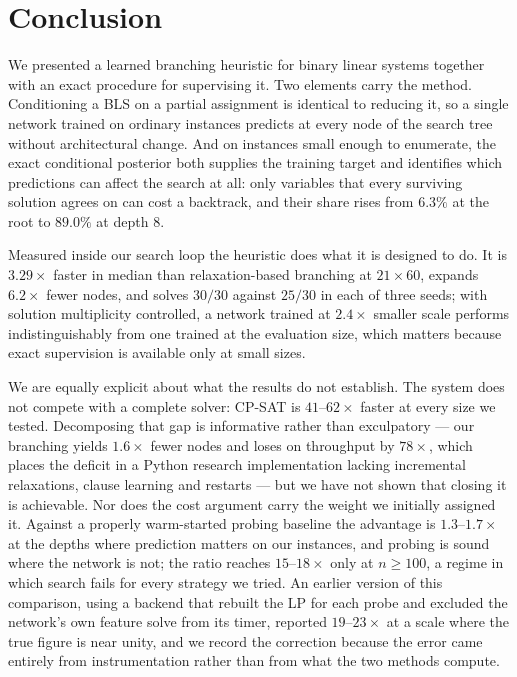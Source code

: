 \documentclass[11pt]{article}
\begin{document}
\section{Conclusion}
\label{sec:conclusion}

We presented a learned branching heuristic for binary linear systems together with an exact procedure for supervising it. Two elements carry the method. Conditioning a BLS on a partial assignment is identical to reducing it, so a single network trained on ordinary instances predicts at every node of the search tree without architectural change. And on instances small enough to enumerate, the exact conditional posterior both supplies the training target and identifies which predictions can affect the search at all: only variables that every surviving solution agrees on can cost a backtrack, and their share rises from $6.3\%$ at the root to $89.0\%$ at depth $8$.

Measured inside our search loop the heuristic does what it is designed to do. It is $3.29\times$ faster in median than relaxation-based branching at $21\times60$, expands $6.2\times$ fewer nodes, and solves $30/30$ against $25/30$ in each of three seeds; with solution multiplicity controlled, a network trained at $2.4\times$ smaller scale performs indistinguishably from one trained at the evaluation size, which matters because exact supervision is available only at small sizes.

We are equally explicit about what the results do not establish. The system does not compete with a complete solver: CP-SAT is $41$--$62\times$ faster at every size we tested. Decomposing that gap is informative rather than exculpatory --- our branching yields $1.6\times$ fewer nodes and loses on throughput by $78\times$, which places the deficit in a Python research implementation lacking incremental relaxations, clause learning and restarts --- but we have not shown that closing it is achievable. Nor does the cost argument carry the weight we initially assigned it. Against a properly warm-started probing baseline the advantage is $1.3$--$1.7\times$ at the depths where prediction matters on our instances, and probing is sound where the network is not; the ratio reaches $15$--$18\times$ only at $n\ge100$, a regime in which search fails for every strategy we tried. An earlier version of this comparison, using a backend that rebuilt the LP for each probe and excluded the network's own feature solve from its timer, reported $19$--$23\times$ at a scale where the true figure is near unity, and we record the correction because the error came entirely from instrumentation rather than from what the two methods compute.
\end{document}
